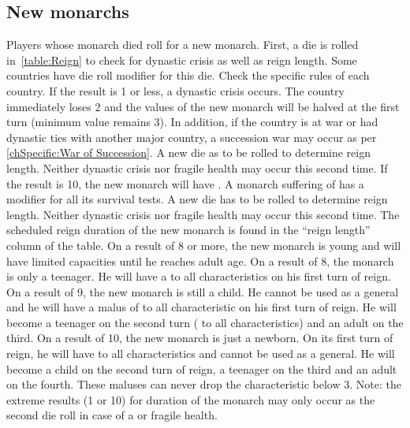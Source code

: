 


\subsection{New monarchs}\label{chEvents:Monarchs}

\aparag Players whose monarch died roll for a new monarch.
 First, a die is rolled in~\ref{table:Reign} to
check for dynastic crisis as well as reign length.
\bparag Some countries have die roll modifier for this die. Check the
specific rules of each country.
\label{chEvents:Dynastic Crisis} If the result
is 1 or less, a dynastic crisis occurs.
\bparag The country immediately loses 2 \STAB and the values of the new
monarch will be halved at the first turn (minimum value remains 3).
\bparag In addition, if the country is at war or had dynastic ties with
another major country, a succession war may occur as per
\ref{chSpecific:War of Succession}.
\bparag A new die as to be rolled to determine reign length. Neither
dynastic crisis nor fragile health may occur this second time.
\aparag If the result is 10, the new monarch will have .
\bparag A monarch suffering of  has a 
modifier for all its survival tests.
\bparag A new die has to be rolled to determine reign length. Neither
dynastic crisis nor fragile health may occur this second time.
\aparag The scheduled reign duration of the new monarch is found in the
``reign length'' column of the table.
\bparag On a result of 8 or more, the new monarch is young and will have
limited capacities until he reaches adult age.
\bparag On a result of 8, the monarch is only a teenager. He will have a
 to all characteristics on his first turn of reign.
\bparag On a result of 9, the new monarch is still a child. He cannot be
used as a general and he will have a malus of  to all
characteristic on his first turn of reign. He will become a teenager on
the second turn ( to all characteristics) and an adult on the
third.
\bparag On a result of 10, the new monarch is just a newborn. On its
first turn of reign, he will have  to all characteristics and
cannot be used as a general. He will become a child on the second turn
of reign, a teenager on the third and an adult on the fourth.
\bparag These maluses can never drop the characteristic below 3.
\aparag Note: the extreme results (1 or 10) for duration of the monarch
may only occur as the second die roll in case of a \DC or fragile
health.

